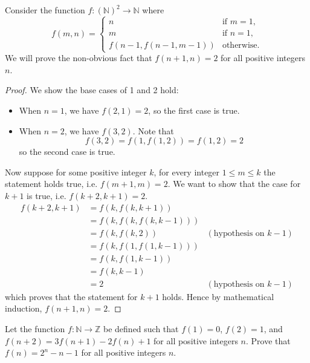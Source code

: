 \begin{example}\label{example-strong-induction-on-function}
    Consider the function $f: \left(\mathbb{N}\right)^2\to\mathbb{N}$ where
    \[
        f(m, n) =
        \begin{cases}
            n & \text{if } m = 1, \\
            m & \text{if } n = 1, \\
            f\left(n-1,f(n-1,m-1)\right) & \text{otherwise.}
        \end{cases}
    \]
    We will prove the non-obvious fact that $f(n+1, n) = 2$ for all positive integers $n$.
    \begin{proof}
        We show the base cases of 1 and 2 hold:
        \begin{itemize}
            \item When $n = 1$, we have $f(2, 1) = 2$, so the first case is true.
            \item When $n = 2$, we have $f(3, 2)$. Note that
            \[
                f(3,2) = f(1, f(1, 2)) = f(1, 2) = 2
            \]
            so the second case is true.
        \end{itemize}
        
        Now suppose for some positive integer $k$, for every integer $1 \leq m \leq k$ the statement holds true, i.e. $f(m+1,m) = 2$. We want to show that the case for $k+1$ is true, i.e. $f(k+2, k+1) = 2$.
        \begin{align*}
            f(k+2, k+1) &= f(k, f(k, k+1))\\
            &= f(k, f(k, f(k, k-1)))\\
            &= f(k, f(k, 2)) & (\text{hypothesis on } k-1)\\
            &= f(k, f(1, f(1, k-1)))\\
            &= f(k, f(1, k-1))\\
            &= f(k, k-1) \\
            &= 2 & (\text{hypothesis on } k-1)
        \end{align*}
        which proves that the statement for $k+1$ holds. Hence by mathematical induction, $f(n+1, n) = 2$.
    \end{proof}
\end{example}

\begin{exercise}
    Let the function $f: \mathbb{N} \to \mathbb{Z}$ be defined such that $f(1) = 0$, $f(2) = 1$, and $f(n+2) = 3f(n+1) - 2f(n) + 1$ for all positive integers $n$. Prove that $f(n) = 2^n - n - 1$ for all positive integers $n$.
\end{exercise}

